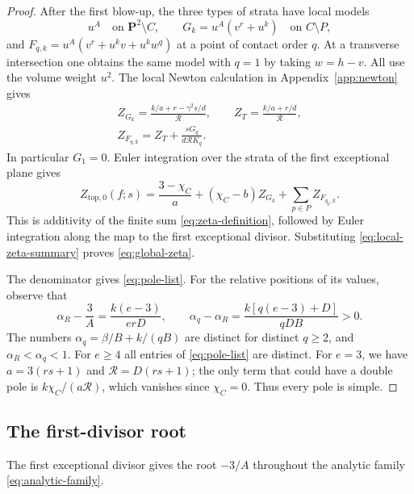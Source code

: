 \documentclass[11pt]{article}
\numberwithin{equation}{section}
\theoremstyle{definition}
\theoremstyle{remark}
\newcommand{\PP}{\mathbf P}
\begin{document}
\begin{proof}
After the first blow-up, the three types of strata have
local models
\[
 u^A\quad\text{on }\PP^2\setminus C,\qquad
 G_k=u^A(v^r+u^k)\quad\text{on }C\setminus P,
\]
and $F_{q,k}=u^A(v^r+u^kv+u^kw^q)$ at a point of contact
order $q$. At a transverse intersection one obtains the
same model with $q=1$ by taking $w=h-v$.
All use the volume weight $u^2$.
The local Newton calculation in Appendix~\ref{app:newton}
gives
\begin{equation}\label{eq:local-zeta-summary}
 \begin{gathered}
 Z_{G_k}=\frac{k/a+r-\gamma^2s/d}{\mathcal R},\qquad
 Z_T=\frac{k/a+r/d}{\mathcal R},\\
 Z_{F_{q,k}}=Z_T+\frac{sG_q}{d\mathcal R K_q}.
 \end{gathered}
\end{equation}
In particular $G_1=0$.
Euler integration over the strata of the first exceptional
plane gives
\begin{equation}\label{eq:zeta-assembly}
 Z_{\mathrm{top},0}(f;s)
   =\frac{3-\chi_C}{a}+(\chi_C-b)Z_{G_k}
                         +\sum_{p\in P}Z_{F_{q_p,k}}.
\end{equation}
This is additivity of the finite sum
\eqref{eq:zeta-definition}, followed by Euler integration
along the map to the first exceptional divisor. Substituting
\eqref{eq:local-zeta-summary} proves \eqref{eq:global-zeta}.

The denominator gives \eqref{eq:pole-list}. For the
relative positions of its values, observe that
\begin{equation}\label{eq:slope-order}
 \alpha_R-\frac3A=\frac{k(e-3)}{erD},\qquad
 \alpha_q-\alpha_R=
          \frac{k[q(e-3)+D]}{qDB}>0.
\end{equation}
The numbers $\alpha_q=\beta/B+k/(qB)$ are distinct for
distinct $q\ge2$, and $\alpha_R<\alpha_q<1$.
For $e\ge4$ all entries of \eqref{eq:pole-list} are
distinct. For $e=3$, we have
$a=3(rs+1)$ and $\mathcal R=D(rs+1)$; the only term
that could have a double pole is
$k\chi_C/(a\mathcal R)$, which vanishes since $\chi_C=0$.
Thus every pole is simple.
\end{proof}

\subsection{The first-divisor root}

The first exceptional divisor gives the root $-3/A$
throughout the analytic family \eqref{eq:analytic-family}.
\end{document}
